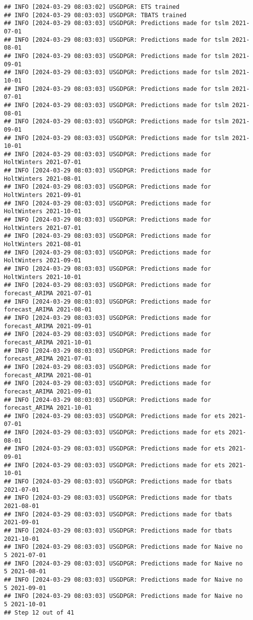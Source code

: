 \documentclass[
]{article}
\begin{document}
\begin{verbatim}
## INFO [2024-03-29 08:03:02] USGDPGR: ETS trained
## INFO [2024-03-29 08:03:03] USGDPGR: TBATS trained
## INFO [2024-03-29 08:03:03] USGDPGR: Predictions made for tslm 2021-07-01
## INFO [2024-03-29 08:03:03] USGDPGR: Predictions made for tslm 2021-08-01
## INFO [2024-03-29 08:03:03] USGDPGR: Predictions made for tslm 2021-09-01
## INFO [2024-03-29 08:03:03] USGDPGR: Predictions made for tslm 2021-10-01
## INFO [2024-03-29 08:03:03] USGDPGR: Predictions made for tslm 2021-07-01
## INFO [2024-03-29 08:03:03] USGDPGR: Predictions made for tslm 2021-08-01
## INFO [2024-03-29 08:03:03] USGDPGR: Predictions made for tslm 2021-09-01
## INFO [2024-03-29 08:03:03] USGDPGR: Predictions made for tslm 2021-10-01
## INFO [2024-03-29 08:03:03] USGDPGR: Predictions made for HoltWinters 2021-07-01
## INFO [2024-03-29 08:03:03] USGDPGR: Predictions made for HoltWinters 2021-08-01
## INFO [2024-03-29 08:03:03] USGDPGR: Predictions made for HoltWinters 2021-09-01
## INFO [2024-03-29 08:03:03] USGDPGR: Predictions made for HoltWinters 2021-10-01
## INFO [2024-03-29 08:03:03] USGDPGR: Predictions made for HoltWinters 2021-07-01
## INFO [2024-03-29 08:03:03] USGDPGR: Predictions made for HoltWinters 2021-08-01
## INFO [2024-03-29 08:03:03] USGDPGR: Predictions made for HoltWinters 2021-09-01
## INFO [2024-03-29 08:03:03] USGDPGR: Predictions made for HoltWinters 2021-10-01
## INFO [2024-03-29 08:03:03] USGDPGR: Predictions made for forecast_ARIMA 2021-07-01
## INFO [2024-03-29 08:03:03] USGDPGR: Predictions made for forecast_ARIMA 2021-08-01
## INFO [2024-03-29 08:03:03] USGDPGR: Predictions made for forecast_ARIMA 2021-09-01
## INFO [2024-03-29 08:03:03] USGDPGR: Predictions made for forecast_ARIMA 2021-10-01
## INFO [2024-03-29 08:03:03] USGDPGR: Predictions made for forecast_ARIMA 2021-07-01
## INFO [2024-03-29 08:03:03] USGDPGR: Predictions made for forecast_ARIMA 2021-08-01
## INFO [2024-03-29 08:03:03] USGDPGR: Predictions made for forecast_ARIMA 2021-09-01
## INFO [2024-03-29 08:03:03] USGDPGR: Predictions made for forecast_ARIMA 2021-10-01
## INFO [2024-03-29 08:03:03] USGDPGR: Predictions made for ets 2021-07-01
## INFO [2024-03-29 08:03:03] USGDPGR: Predictions made for ets 2021-08-01
## INFO [2024-03-29 08:03:03] USGDPGR: Predictions made for ets 2021-09-01
## INFO [2024-03-29 08:03:03] USGDPGR: Predictions made for ets 2021-10-01
## INFO [2024-03-29 08:03:03] USGDPGR: Predictions made for tbats 2021-07-01
## INFO [2024-03-29 08:03:03] USGDPGR: Predictions made for tbats 2021-08-01
## INFO [2024-03-29 08:03:03] USGDPGR: Predictions made for tbats 2021-09-01
## INFO [2024-03-29 08:03:03] USGDPGR: Predictions made for tbats 2021-10-01
## INFO [2024-03-29 08:03:03] USGDPGR: Predictions made for Naive no  5 2021-07-01
## INFO [2024-03-29 08:03:03] USGDPGR: Predictions made for Naive no  5 2021-08-01
## INFO [2024-03-29 08:03:03] USGDPGR: Predictions made for Naive no  5 2021-09-01
## INFO [2024-03-29 08:03:03] USGDPGR: Predictions made for Naive no  5 2021-10-01
## Step 12 out of 41
\end{verbatim}
\end{document}
